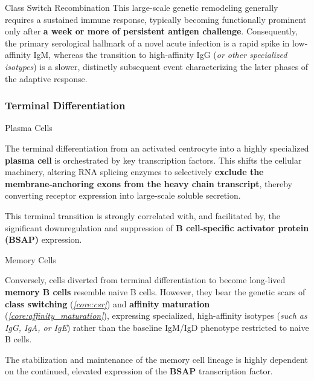 \begin{core}[label=core:csr]{Class Switch Recombination}
        This large-scale genetic remodeling generally requires a sustained immune response, typically becoming functionally prominent only after \textbf{a week or more of persistent antigen challenge}. Consequently, the primary serological hallmark of a novel acute infection is a rapid spike in low-affinity IgM, whereas the transition to high-affinity IgG (\textit{or other specialized isotypes}) is a slower, distinctly subsequent event characterizing the later phases of the adaptive response.
        
      \end{core}

    \subsubsection{Terminal Differentiation}

      \begin{core}{Plasma Cells}

        The terminal differentiation from an activated centrocyte into a highly specialized \textbf{plasma cell} is orchestrated by key transcription factors. This shifts the cellular machinery, altering RNA splicing enzymes to selectively \textbf{exclude the membrane-anchoring exons from the heavy chain transcript}, thereby converting receptor expression into large-scale soluble secretion.

        This terminal transition is strongly correlated with, and facilitated by, the significant downregulation and suppression of \textbf{B cell-specific activator protein (BSAP)} expression.

      \end{core}

      \begin{core}{Memory Cells}

        Conversely, cells diverted from terminal differentiation to become long-lived \textbf{memory B cells} resemble naive B cells. However, they bear the genetic scars of \textbf{class switching} (\textit{\autoref{core:csr}}) and \textbf{affinity maturation} (\textit{\autoref{core:affinity_maturation}}), expressing specialized, high-affinity isotypes (\textit{such as IgG, IgA, or IgE}) rather than the baseline IgM/IgD phenotype restricted to naive B cells.

        The stabilization and maintenance of the memory cell lineage is highly dependent on the continued, elevated expression of the \textbf{BSAP} transcription factor.

      \end{core}

